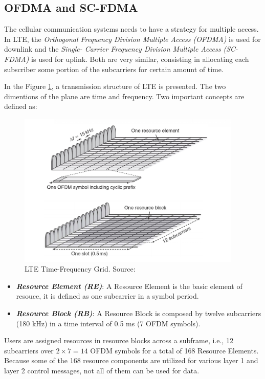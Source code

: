 \subsection{OFDMA and SC-FDMA}
The cellular communication systems needs to have a strategy for multiple access. In LTE, the 
\textit{Orthogonal Frequency Division Multiple Access (OFDMA)} is used for downlink and the \textit{Single-
Carrier Frequency Division Multiple Access (SC-FDMA)} is used for uplink. Both are very similar, consisting
in allocating each subscriber some portion of the subcarriers for certain amount of time.

In the Figure \ref{fig:lterb}, a transmission structure of LTE is presented. The two dimentions of the 
plane are time and frequency. Two important concepts are defined as:

\begin{figure}[h]
  \centering
  \includegraphics[width=0.95\textwidth]{img/lte_rb.png}
  \caption{LTE Time-Frequency Grid. Source:\cite{cmov1} }
  \label{fig:lterb}
\end{figure}

\begin{itemize}
  \item \textbf{\textit{Resource Element (RE)}}: A Resource Element is the basic element of resouce, it is
  defined as one subcarrier in a symbol period.
  \item \textbf{\textit{Resource Block (RB)}}: A Resource Block is composed by twelve subcarriers (180 kHz) in 
  a time interval of 0.5 ms (7 OFDM symbols).
\end{itemize}


Users are assigned resources in resource blocks across a subframe, i.e., 12 subcarriers over ${2\times7 = 14}$
OFDM symbols for a total of 168 Resource Elements. Because some of the 168 resource components are utilized 
for various layer 1 and layer 2 control messages, not all of them can be used for data.

